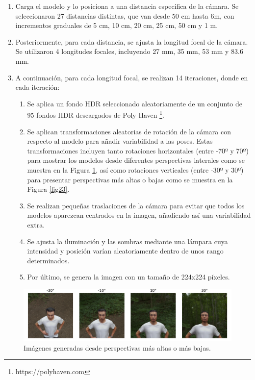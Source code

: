 \begin{enumerate}
	\item Carga el modelo y lo posiciona a una distancia específica de la cámara. Se seleccionaron 27 distancias distintas, que van desde 50 cm hasta 6m, con incrementos graduales de 5 cm, 10 cm, 20 cm, 25 cm, 50 cm y 1 m.
	\item Posteriormente, para cada distancia, se ajusta la longitud focal de la cámara. Se utilizaron 4 longitudes focales, incluyendo 27 mm, 35 mm, 53 mm y 83.6 mm.
	\item A continuación, para cada longitud focal, se realizan 14 iteraciones, donde en cada iteración:
	\begin{enumerate}
		\item Se aplica un fondo HDR seleccionado aleatoriamente de un conjunto de 95 fondos HDR descargados de Poly Haven \footnote{https://polyhaven.com}.
		\item Se aplican transformaciones aleatorias de rotación de la cámara con respecto al modelo para añadir variabilidad a las poses. Estas transformaciones incluyen tanto rotaciones horizontales (entre -70º y 70º) para mostrar los modelos desde diferentes perspectivas laterales como se muestra en la Figura \ref{fig22}, así como rotaciones verticales (entre -30º y 30º) para presentar perspectivas más altas o bajas como se muestra en la Figura \ref{fig23}.
		\item Se realizan pequeñas traslaciones de la cámara para evitar que todos los modelos aparezcan centrados en la imagen, añadiendo así una variabilidad extra.
		\item Se ajusta la iluminación y las sombras mediante una lámpara cuya intensidad y posición varían aleatoriamente dentro de unos rango determinados.
		\item Por último, se genera la imagen con un tamaño de 224x224 píxeles.
	\end{enumerate}
\end{enumerate}

\begin{figure}[h]
	\centering
	\includegraphics[scale=0.4]{imagenes/cap4/imagenes_rotacion_vertical.png}
	\caption[Ejemplos de imágenes rotadas verticalmente.]{Imágenes generadas desde perspectivas más altas o más bajas.}
	\label{fig22}
\end{figure}

